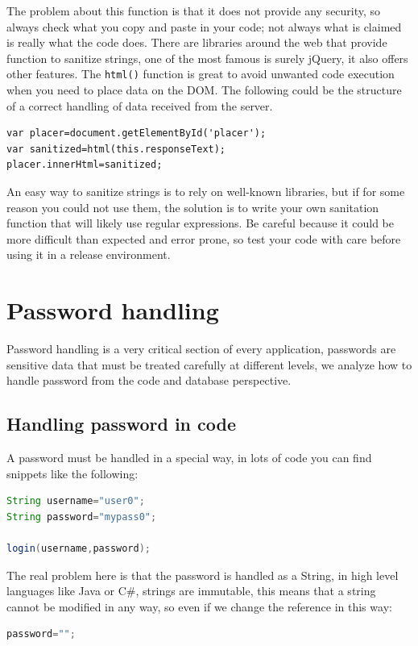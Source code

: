 The problem about this function is that it does not provide any security, so always check what you copy and paste in your code; not always what is claimed is really what the code does.\newline
There are libraries around the web that provide function to sanitize strings, one of the most famous is surely jQuery, it also offers other features. The \texttt{html()} function is great to avoid unwanted code execution when you need to place data on the DOM.\newline
The following could be the structure of a correct handling of data received from the server.\newline
\begin{lstlisting}
var placer=document.getElementById('placer');
var sanitized=html(this.responseText);
placer.innerHtml=sanitized;
\end{lstlisting}
An easy way to sanitize strings is to rely on well-known libraries, but if for some reason you could not use them, the solution is to write your own sanitation function that will likely use regular expressions. Be careful because it could be more difficult than expected and error prone, so test your code with care before using it in a release environment.\newline

\section{Password handling}
Password handling is a very critical section of every application, passwords are sensitive data that must be treated carefully at different levels, we analyze how to handle password from the code and database perspective.\newline

\subsection{Handling password in code}
A password must be handled in a special way, in lots of code you can find snippets like the following:
\begin{lstlisting}[language=java]
String username="user0";
String password="mypass0";

login(username,password);
\end{lstlisting}

The real problem here is that the password is handled as a String, in high level languages like Java or C\#, strings are immutable, this means that a string cannot be modified in any way, so even if we change the reference in this way:
\begin{lstlisting}[language=java]
password="";
\end{lstlisting}


